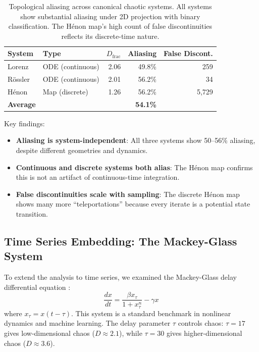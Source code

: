 \documentclass[12pt]{article}
\begin{document}
\begin{table}[h]
\centering
\begin{tabular}{@{}llrrr@{}}
\toprule
\textbf{System} & \textbf{Type} & \textbf{$D_{\text{frac}}$} & \textbf{Aliasing} & \textbf{False Discont.} \\
\midrule
Lorenz & ODE (continuous) & 2.06 & 49.8\% & 259 \\
Rössler & ODE (continuous) & 2.01 & 56.2\% & 34 \\
Hénon & Map (discrete) & 1.26 & 56.2\% & 5,729 \\
\midrule
\textbf{Average} & & & \textbf{54.1\%} & \\
\bottomrule
\end{tabular}
\caption{Topological aliasing across canonical chaotic systems. All systems show substantial aliasing under 2D projection with binary classification. The Hénon map's high count of false discontinuities reflects its discrete-time nature.}
\label{tab:chaotic}
\end{table}

Key findings:
\begin{itemize}
    \item \textbf{Aliasing is system-independent}: All three systems show 50--56\% aliasing, despite different geometries and dynamics.
    \item \textbf{Continuous and discrete systems both alias}: The Hénon map confirms this is not an artifact of continuous-time integration.
    \item \textbf{False discontinuities scale with sampling}: The discrete Hénon map shows many more ``teleportations'' because every iterate is a potential state transition.
\end{itemize}

\subsection{Time Series Embedding: The Mackey-Glass System}

To extend the analysis to time series, we examined the Mackey-Glass delay differential equation \cite{mackey1977}:
\begin{equation}
\frac{dx}{dt} = \frac{\beta x_\tau}{1 + x_\tau^n} - \gamma x
\end{equation}
where $x_\tau = x(t - \tau)$. This system is a standard benchmark in nonlinear dynamics and machine learning. The delay parameter $\tau$ controls chaos: $\tau = 17$ gives low-dimensional chaos ($D \approx 2.1$), while $\tau = 30$ gives higher-dimensional chaos ($D \approx 3.6$).
\end{document}
